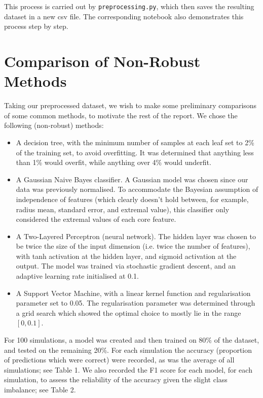 \documentclass[11pt]{article}
\begin{document}
This process is carried out by \texttt{preprocessing.py}, which then saves the resulting dataset in a new csv file. The corresponding notebook also demonstrates this process step by step. 

\section{Comparison of Non-Robust Methods}

Taking our preprocessed dataset, we wish to make some preliminary comparisons of some common methods, to motivate the rest of the report. We chose the following (non-robust) methods:
\begin{itemize}
	\item A decision tree, with the minimum number of samples at each leaf set to 2\% of the training set, to avoid overfitting. It was determined that anything less than 1\% would overfit, while anything over 4\% would underfit. 
	\item A Gaussian Naive Bayes classifier. A Gaussian model was chosen since our data was previously normalised. To accommodate the Bayesian assumption of independence of features (which clearly doesn't hold between, for example, radius mean, standard error, and extremal value), this classifier only considered the extremal values of each core feature. 
	\item A Two-Layered Perceptron (neural network). The hidden layer was chosen to be twice the size of the input dimension (i.e. twice the number of features), with tanh activation at the hidden layer, and sigmoid activation at the output. The model was trained via stochastic gradient descent, and an adaptive learning rate initialised at 0.1. 
	\item A Support Vector Machine, with a linear kernel function and regularisation parameter set to 0.05. The regularisation parameter was determined through a grid search which showed the optimal choice to mostly lie in the range $[0, 0.1]$. 
\end{itemize}
For 100 simulations, a model was created and then trained on 80\% of the dataset, and tested on the remaining 20\%. For each simulation the accuracy (proportion of predictions which were correct) were recorded, as was the average of all simulations; see Table 1. We also recorded the F1 score for each model, for each simulation, to assess the reliability of the accuracy given the slight class imbalance; see Table 2. 
\end{document}
